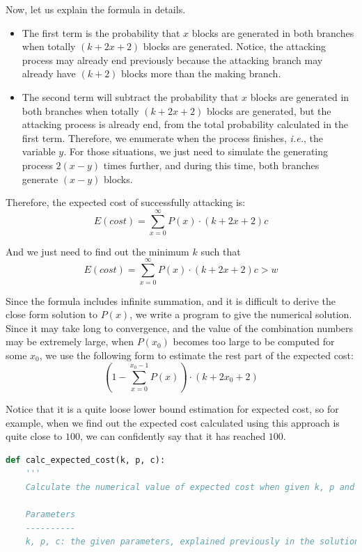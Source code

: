 \documentclass{oxmathproblems}
\makeatletter
\theoremstyle{definition}
\renewenvironment{solution}[1][Solution] {\par\pushQED{\qed}\normalfont\topsep6\p@\@plus6\p@\relax\trivlist\item[\hskip\labelsep\bfseries#1\@addpunct{.}]\ignorespaces}{\popQED\endtrivlist\@endpefalse} \makeatother
\makeatother
\begin{document}
\begin{solution}
	Now, let us explain the formula in details.
	\begin{itemize}
		\item The first term is the probability that $x$ blocks are generated in both branches when totally $(k+2x+2)$ blocks are generated. Notice, the attacking process may already end previously because the attacking branch may already have $(k + 2)$ blocks more than the making branch.
		\item The second term will subtract the probability that $x$ blocks are generated in both branches when totally $(k+2x+2)$ blocks are generated, but the attacking process is already end, from the total probability calculated in the first term. Therefore, we enumerate when the process finishes, \textit{i.e.}, the variable $y$. For those situations, we just need to simulate the generating process $2(x-y)$ times further, and during this time, both branches generate $(x - y)$ blocks. 
	\end{itemize}

	Therefore, the expected cost of successfully attacking is:
	$$
	E(cost) = \sum_{x=0}^\infty P(x) \cdot (k+2x+2)c
	$$

	And we just need to find out the minimum $k$ such that
	$$
	E(cost) = \sum_{x=0}^\infty P(x) \cdot (k+2x+2)c > w
	$$

	Since the formula includes infinite summation, and it is difficult to derive the close form solution to $P(x)$, we write a program to give the numerical solution. Since it may take long to convergence, and the value of the combination numbers may be extremely large, when $P(x_0)$ becomes too large to be computed for some $x_0$, we use the following form to estimate the rest part of the expected cost:
	$$
	\left(1 - \sum_{x=0}^{x_0-1} P(x)\right) \cdot (k + 2x_0 + 2)
	$$
	
	Notice that it is a quite loose lower bound estimation for expected cost, so for example, when we find out the expected cost calculated using this approach is quite close to $100$, we can confidently say that it has reached $100$.
\begin{lstlisting}[language=python]
def calc_expected_cost(k, p, c):
    '''
    Calculate the numerical value of expected cost when given k, p and c.

    Parameters
    ----------
    k, p, c: the given parameters, explained previously in the solution.
    

\end{lstlisting}
\end{solution}
\end{document}
